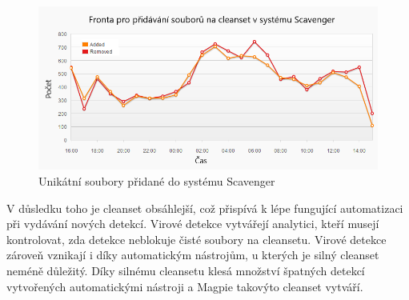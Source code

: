 \documentclass[thesis=M,czech,hidelinks]{FITthesis}[2013/05/06]
\begin{document}
\begin{figure}[h]
	\centering
	\includegraphics[width=12cm]{pictures/scav.png}
	\caption{Unikátní soubory přidané do systému Scavenger}
	\label{fig:scav}
\end{figure}

V důsledku toho je cleanset obsáhlejší, což přispívá k lépe fungující automatizaci při vydávání nových detekcí. Virové detekce vytvářejí analytici, kteří musejí kontrolovat, zda detekce neblokuje čisté soubory na cleansetu. Virové detekce zároveň vznikají i díky automatickým nástrojům, u kterých je silný cleanset neméně důležitý. Díky silnému cleansetu klesá množství špatných detekcí vytvořených automatickými nástroji a Magpie takovýto cleanset vytváří.







 \setlength{\parskip}{10pt}
\end{document}
